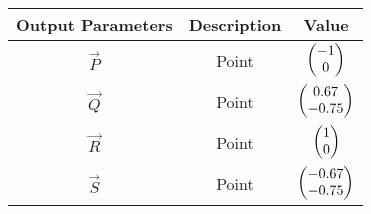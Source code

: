     \begin{tabular}{|c|c|c|}
    \hline
        \textbf{Output Parameters} &\textbf{Description} &\textbf{Value} \\
\hline
          $\vec{P}$ & Point &$\begin{pmatrix}-1\\0\end{pmatrix}$ \\

         \hline
          $\vec{Q}$ & Point &$\begin{pmatrix}0.67\\-0.75\end{pmatrix}$ \\
         \hline
          $\vec{R}$ & Point &$\begin{pmatrix}1\\0\end{pmatrix}$ \\
         \hline
          $\vec{S}$ & Point &$\begin{pmatrix}-0.67\\-0.75\end{pmatrix}$ \\
         \hline
    \end{tabular}
